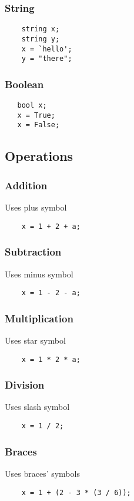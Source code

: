 \documentclass[12pt,letterpaper]{article}
\begin{document}
\subsubsection{String}
\begin{verbatim}
    string x;
    string y;
    x = `hello';
    y = "there";
\end{verbatim}

\subsubsection{Boolean}
\begin{verbatim}
   bool x;
   x = True;
   x = False;
\end{verbatim}

\subsection{Operations}
\subsubsection{Addition}
Uses plus symbol
\begin{verbatim}
    x = 1 + 2 + a;
\end{verbatim}

\subsubsection{Subtraction}
Uses minus symbol
\begin{verbatim}
    x = 1 - 2 - a;
\end{verbatim}


\subsubsection{Multiplication}
Uses star symbol
\begin{verbatim}
    x = 1 * 2 * a;
\end{verbatim}


\subsubsection{Division}
Uses slash symbol
\begin{verbatim}
    x = 1 / 2;
\end{verbatim}

\subsubsection{Braces}
Uses braces' symbols
\begin{verbatim}
    x = 1 + (2 - 3 * (3 / 6));
\end{verbatim}
\end{document}
